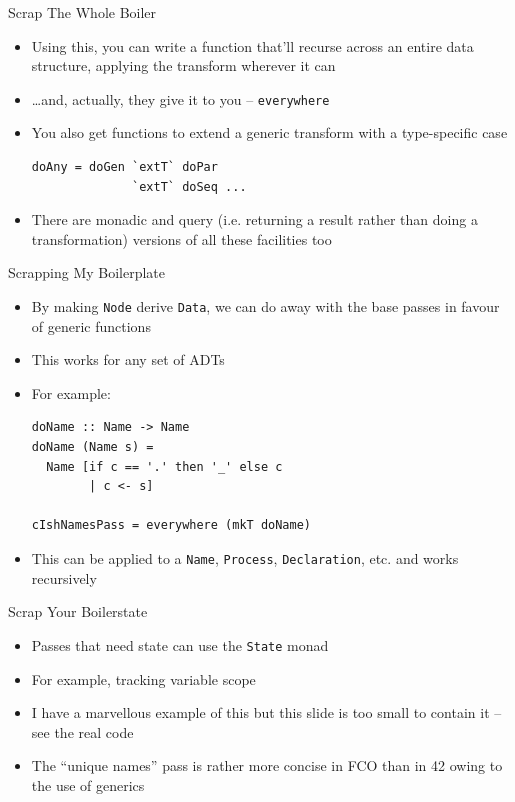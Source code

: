 \documentclass[adam,pdf,slideColor]{prosper}
\begin{document}
\begin{slide}{Scrap The Whole Boiler}
\begin{itemize}
\item Using this, you can write a function that'll recurse across an
  entire data structure, applying the transform wherever it can
\item \ldots and, actually, they give it to you -- \verb|everywhere|
\item You also get functions to extend a generic transform with a
  type-specific case
\begin{verbatim}
doAny = doGen `extT` doPar
              `extT` doSeq ...
\end{verbatim}
\item There are monadic and query (i.e. returning a result rather than
  doing a transformation) versions of all these facilities too
\end{itemize}
\end{slide}

\begin{slide}{Scrapping My Boilerplate}
\begin{itemize}
\item By making \verb|Node| derive \verb|Data|, we can do away with
  the base passes in favour of generic functions
\item This works for any set of ADTs
\item For example:
\begin{verbatim}
doName :: Name -> Name
doName (Name s) =
  Name [if c == '.' then '_' else c
        | c <- s]

cIshNamesPass = everywhere (mkT doName)
\end{verbatim}
\item This can be applied to a \verb|Name|, \verb|Process|,
  \verb|Declaration|, etc. and works recursively
\end{itemize}
\end{slide}

\begin{slide}{Scrap Your Boilerstate}
\begin{itemize}
\item Passes that need state can use the \verb|State| monad
\item For example, tracking variable scope
\item I have a marvellous example of this but this slide is too small
  to contain it -- see the real code
\item The ``unique names'' pass is rather more concise in FCO than
  in 42 owing to the use of generics
\end{itemize}
\end{slide}
\end{document}
